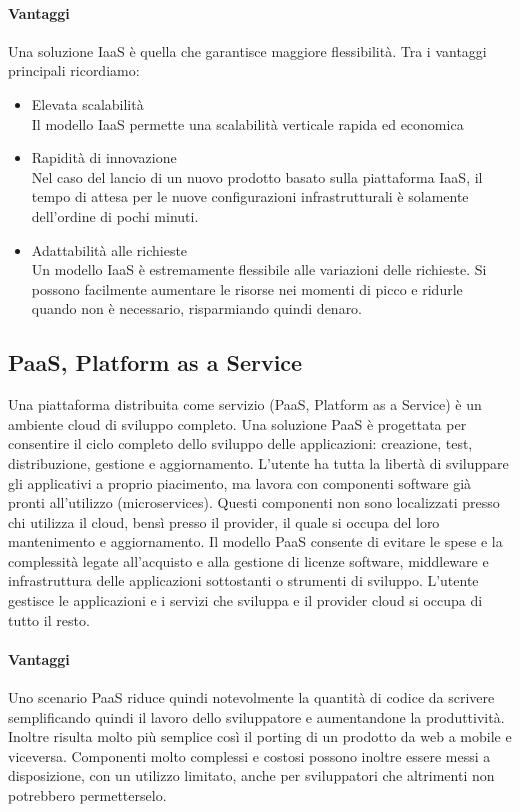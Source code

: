 \paragraph{Vantaggi}
Una soluzione IaaS è quella che garantisce maggiore flessibilità. Tra i vantaggi principali ricordiamo:
\begin{itemize}
	\item  Elevata scalabilità \\
	Il modello IaaS permette una scalabilità verticale rapida ed economica
	\item Rapidità di innovazione \\
	Nel caso del lancio di un nuovo prodotto basato sulla piattaforma IaaS, il tempo di attesa per le nuove configurazioni infrastrutturali è solamente dell'ordine di pochi minuti.
	\item Adattabilità alle richieste \\
	Un modello IaaS è estremamente flessibile alle variazioni delle richieste. Si possono facilmente aumentare le risorse nei momenti di picco e ridurle quando non è necessario, risparmiando quindi denaro.
	
\end{itemize}
\subsection{PaaS, Platform as a Service}
Una piattaforma distribuita come servizio (PaaS, Platform as a Service) è un ambiente cloud di sviluppo completo. Una soluzione PaaS è progettata per consentire il ciclo completo dello sviluppo delle applicazioni: creazione, test, distribuzione, gestione e aggiornamento. L'utente ha tutta la libertà di sviluppare gli applicativi a proprio piacimento, ma lavora con componenti software già pronti all'utilizzo (microservices). Questi componenti non sono localizzati presso chi utilizza il cloud, bensì presso il provider, il quale si occupa del loro mantenimento e aggiornamento. Il modello PaaS consente di evitare le spese e la complessità legate all'acquisto e alla gestione di licenze software, middleware e infrastruttura delle applicazioni sottostanti o strumenti di sviluppo. L'utente gestisce le applicazioni e i servizi che sviluppa e il provider cloud si occupa di tutto il resto.
\paragraph{Vantaggi}
Uno scenario PaaS riduce quindi notevolmente la quantità di codice da scrivere semplificando quindi il lavoro dello sviluppatore e aumentandone la produttività. Inoltre risulta molto più semplice così il porting di un prodotto da web a mobile e viceversa. Componenti molto complessi e costosi possono inoltre essere messi a disposizione, con un utilizzo limitato, anche per sviluppatori che altrimenti non potrebbero permetterselo. 
